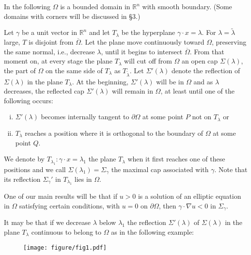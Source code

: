 In the following $\Omega$ is a bounded domain in $\mathbb{R}^n$ with smooth boundary.
(Some domains with corners will be discussed in \S 3.)

Let $\gamma$ be a unit vector in $\mathbb{R}^n$ and let $T_{\lambda}$ be the
hyperplane $\gamma\cdot x = \lambda$. For $\lambda=\tilde{\lambda}$ large,
$T$ is disjoint from $\overline{\Omega}$.
Let the plane move continuously toward $\Omega$,
preserving the same normal, i.e., decrease $\lambda$,
until it begins to intersect $\overline{\Omega}$.
From that moment on, at every stage the plane $T_{\lambda}$ will cut off from $\Omega$
an open cap $\Sigma(\lambda)$, the part of $\Omega$ on
the same side of $T_{\lambda}$ as $T_{\tilde{\lambda}}$.
Let $\Sigma'(\lambda)$ denote the reflection of $\Sigma(\lambda)$ in the plane $T_{\lambda}$.
At the beginning, $\Sigma'(\lambda)$ will be in $\Omega$ and as $\lambda$ decreases,
the reflected cap $\Sigma'(\lambda)$ will remain in $\Omega$,
at least until one of the following occurs:

\begin{enumerate}[(i)]
  \item $\Sigma'(\lambda)$ becomes internally tangent to $\partial\Omega$ at some point $P$
    not on $T_\lambda$ or
  \item $T_\lambda$ reaches a position where it is orthogonal to the boundary of $\Omega$
    at some point $Q$.
\end{enumerate}

We denote by $T_{\lambda_1}: \gamma\cdot x = \lambda_1$ the plane $T_\lambda$
when it first reaches one of these positions and we call $\Sigma(\lambda_1)=\Sigma_{\gamma}$
the maximal cap associated with $\gamma$. Note that its reflection $\Sigma_{\gamma}'$
in $T_{\lambda_1}$ lies in $\Omega$.

One of our main results will be that if $u > 0$ is a solution of an elliptic equation
in $\Omega$ satisfying certain conditions, with $u = 0$ on $\partial\Omega$,
then $\gamma\cdot\nabla u<0$ in $\Sigma_\gamma$.

It may be that if we decrease $\lambda$ below $\lambda_1$
the reflection $\Sigma'(\lambda)$ of $\Sigma(\lambda)$ in the plane $T_\lambda$
continuous to belong to $\Omega$ as in the following example:

\begin{figure}[htbp]
  \centering
  \texttt{[image: figure/fig1.pdf]}
  \caption{}
  \label{fig:1}
\end{figure}

